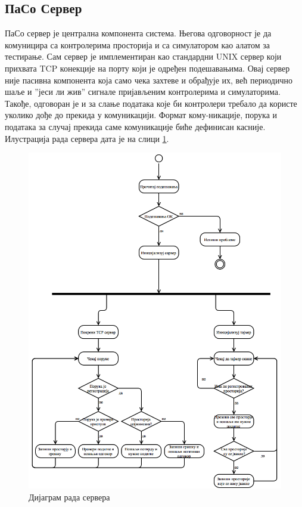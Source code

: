 \documentclass[a4paper, 12pt, diplomski]{etfcyr}
\begin{document}
			\subsection{ПаСо Сервер}
				\begin{justify}
					ПаСо сервер је централна компонента система. Његова одговорност је да комуницира са контролерима просторија и са симулатором као алатом за тестирање. Сам сервер је имплементиран као стандардни UNIX сервер који прихвата TCP конекције на порту који је одређен подешавањима. Овај сервер није пасивна компонента која само чека захтеве и обрађује их, већ периодично шаље и ”јеси ли жив” сигнале пријављеним контролерима и симулаторима. Такође, одговоран је и за слање података које би контролери требало да користе уколико дође до прекида у комуникацији. Формат кому-никације, порука и података за случај прекида саме комуникације биће дефинисан касније.
					Илустрација рада сервера дата је на слици \ref{figure:3}.
					\begin{figure}[h]
						\begin{center}
							\includegraphics[scale=0.35]{ServerWorkflow.png}
						\end{center}
						\caption{Дијаграм рада сервера}
						\label{figure:3}
					\end{figure}
				\end{justify}
\end{document}
